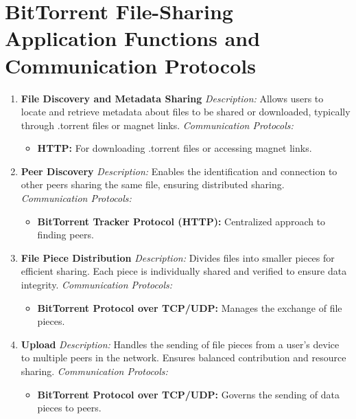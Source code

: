 \documentclass[a4paper]{article}
\begin{document}
\newpage
\tableofcontents
\newpage

\section{BitTorrent File-Sharing Application Functions and Communication Protocols}

\begin{enumerate}[label=\textbf{\arabic*.}, leftmargin=*, itemsep=10pt]

    \item \textbf{File Discovery and Metadata Sharing}  
    \textit{Description:} Allows users to locate and retrieve metadata about files to be shared or downloaded, typically through .torrent files or magnet links.  
    \textit{Communication Protocols:}
    \begin{itemize}
        \item \textbf{HTTP:} For downloading .torrent files or accessing magnet links.
    \end{itemize}

    \item \textbf{Peer Discovery}  
    \textit{Description:} Enables the identification and connection to other peers sharing the same file, ensuring distributed sharing.  
    \textit{Communication Protocols:}
    \begin{itemize}
        \item \textbf{BitTorrent Tracker Protocol (HTTP):} Centralized approach to finding peers.
    \end{itemize}

    \item \textbf{File Piece Distribution}  
    \textit{Description:} Divides files into smaller pieces for efficient sharing. Each piece is individually shared and verified to ensure data integrity.  
    \textit{Communication Protocols:}
    \begin{itemize}
        \item \textbf{BitTorrent Protocol over TCP/UDP:} Manages the exchange of file pieces.
    \end{itemize}

    \item \textbf{Upload}  
    \textit{Description:} Handles the sending of file pieces from a user's device to multiple peers in the network. Ensures balanced contribution and resource sharing.  
    \textit{Communication Protocols:}
    \begin{itemize}
        \item \textbf{BitTorrent Protocol over TCP/UDP:} Governs the sending of data pieces to peers.
    \end{itemize}


\end{enumerate}
\end{document}
